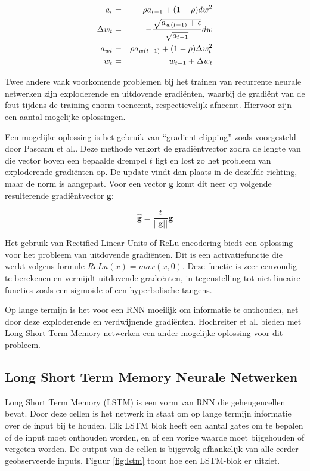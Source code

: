 \begin{eqnarray}
\vspace{-3mm}
    \label{adadelta:start}
    a_t & = & \rho  a_{t-1} + (1 - \rho)dw^2 \\
    \Delta w_t & = & - \frac{\sqrt{a_{w(t-1)} + \epsilon}}{\sqrt{a_{t-1}}}dw \\
    a_{wt} & = & \rho  a_{w(t-1)} + (1 - \rho)\Delta w_t^2 \\
    w_t & = & w_{t-1} + \Delta w_t
    \label{formule:adadelta}
    \vspace{-3mm}
\end{eqnarray}


Twee andere vaak voorkomende problemen bij het trainen van recurrente neurale netwerken zijn exploderende en uitdovende gradi\"enten, waarbij de gradi\"ent van de fout tijdens de training enorm toeneemt, respectievelijk afneemt. Hiervoor zijn een aantal mogelijke oplossingen.

Een mogelijke oplossing is het gebruik van ``gradient clipping'' zoals voorgesteld door Pascanu et al.\cite{Pascanu2012}. Deze methode verkort de gradi\"entvector zodra de lengte van die vector boven een bepaalde drempel $t$ ligt en lost zo het probleem van exploderende gradi\"enten op. De update vindt dan plaats in de dezelfde richting, maar de norm is aangepast. Voor een vector $\mathbf{g}$ komt dit neer op volgende resulterende gradi\"entvector $\mathbf{\hat{g}}$:

\begin{equation}
    \mathbf{\hat{g}} = \frac{t}{||\mathbf{g}||}\mathbf{g}
\end{equation}

Het gebruik van Rectified Linear Units of ReLu-encodering biedt een oplossing voor het probleem van uitdovende gradi\"enten. Dit is een activatiefunctie die werkt volgens formule $ReLu(x) = max(x,0)$. Deze functie is zeer eenvoudig te berekenen en vermijdt uitdovende grade\"enten, in tegenstelling tot niet-lineaire functies zoals een sigmo\"ide of een hyperbolische tangens\cite{Glorot2011}.

Op lange termijn is het voor een RNN moeilijk om informatie te onthouden, net door deze exploderende en verdwijnende gradi\"enten. Hochreiter et al.\cite{SeppHochreiter1997} bieden met Long Short Term Memory netwerken een ander mogelijke oplossing voor dit probleem.

\subsection{Long Short Term Memory Neurale Netwerken}
\label{sub:lstm}
Long Short Term Memory (LSTM) is een vorm van RNN die geheugencellen bevat. Door deze cellen is het netwerk in staat om op lange termijn informatie over de input bij te houden. Elk LSTM blok heeft een aantal gates om te bepalen of de input moet onthouden worden, en of een vorige waarde moet bijgehouden of vergeten worden. De output van de cellen is bijgevolg afhankelijk van alle eerder geobserveerde inputs. Figuur \ref{fig:lstm} toont hoe een LSTM-blok er uitziet.\cite{Google,SeppHochreiter1997}

